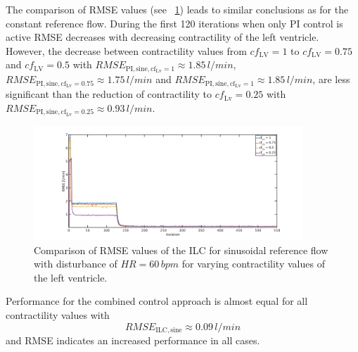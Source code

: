 The comparison of RMSE values (see \figurename~\ref{fig:RMSE_dist_sine_var_cf}) leads to similar conclusions as for the constant reference flow. During the first 120 iterations when only PI control is active RMSE decreases with decreasing contractility of the left ventricle. However, the decrease between contractility values from $cf_{\mathrm{LV}}=1$ to $cf_{\mathrm{LV}}=0.75$ and $cf_{\mathrm{LV}}=0.5$ with $RMSE_{\mathrm{PI,sine,cf_{\mathrm{Lv}}=1}}\approx 1.85\, l/min$, $RMSE_{\mathrm{PI,sine,cf_{\mathrm{Lv}}=0.75}}\approx 1.75\, l/min$ and $RMSE_{\mathrm{PI,sine,cf_{\mathrm{Lv}}=1}}\approx 1.85\, l/min$, are less significant than the reduction of contractility to $cf_{\mathrm{Lv}}=0.25$ with $RMSE_{\mathrm{PI,sine,cf_{\mathrm{Lv}}=0.25}}\approx 0.93\, l/min$.
\begin{figure}[ht!]
  \centering
  \includegraphics[width=0.9\textwidth]{images/chapt_5/ILC/RMSE_dist_sine_var_cf.pdf}
  \caption[RMSE Comparison of ILC at sinusoidal reference flow for varying left ventricular contractilities]{Comparison of RMSE values of the ILC for sinusoidal reference flow with disturbance of $HR=60\,bpm$ for varying contractility values of the left ventricle.}
  \label{fig:RMSE_dist_sine_var_cf}
\end{figure}
Performance for the combined control approach is almost equal for all contractility values with
\begin{equation}
  RMSE_{\mathrm{ILC,sine}}\approx 0.09\, l/min
\end{equation}
and RMSE indicates an increased performance in all cases.

